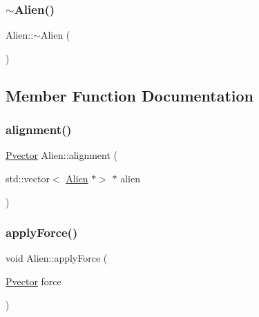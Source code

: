 \mbox{\label{class_alien_a7cdfd79d84b51a18003bf41585aedd43}} 
\subsubsection{\texorpdfstring{$\sim$\+Alien()}{~Alien()}}
{\footnotesize\ttfamily Alien\+::$\sim$\+Alien (\begin{DoxyParamCaption}{ }\end{DoxyParamCaption})}



\subsection{Member Function Documentation}
\mbox{\label{class_alien_ae1e91676d1f4bef69397a21d6ba4867a}} 
\subsubsection{\texorpdfstring{alignment()}{alignment()}}
{\footnotesize\ttfamily \hyperlink{class_pvector}{Pvector} Alien\+::alignment (\begin{DoxyParamCaption}\item[{std\+::vector$<$ \hyperlink{class_alien}{Alien} $\ast$$>$ $\ast$}]{alien }\end{DoxyParamCaption})}

\mbox{\label{class_alien_a0b57e5b389ab46700ceee75c3b174d0f}} 
\subsubsection{\texorpdfstring{apply\+Force()}{applyForce()}}
{\footnotesize\ttfamily void Alien\+::apply\+Force (\begin{DoxyParamCaption}\item[{\hyperlink{class_pvector}{Pvector}}]{force }\end{DoxyParamCaption})}

\mbox{\label{class_alien_a768bd4e8f7b409f8a7c3b4ac6cdd598f}} 
